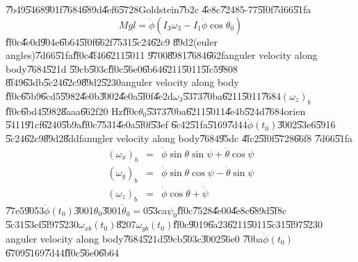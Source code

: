 \clearpage%


\U{7b49}\U{5468}\U{901f}\U{7684}\U{689d}\U{4ef6}\U{5728}Goldstein\U{7b2c}%
\U{4e8c}\U{7248}5-77\U{5f0f}\U{7d66}\U{51fa}%
\begin{equation*}
Mgl=\dot{\phi}\left( I_{3}\omega _{3}-I_{1}\dot{\phi}\cos \theta _{0}\right) 
\end{equation*}%
\U{ff0c}\U{4e0d}\U{904e}\U{6b64}\U{5f0f}\U{662f}\U{7531}\U{5c24}\U{62c9}%
\U{89d2}(euler angles)\U{7d66}\U{51fa}\U{ff0c}\U{4f46}\U{6211}\U{5011}%
\U{9700}\U{8981}\U{7684}\U{662f}anguler velocity along body\U{7684}\U{521d}%
\U{59cb}\U{503c}\U{ff0c}\U{56e0}\U{6b64}\U{6211}\U{5011}\U{5fc5}\U{9808}%
\U{8f49}\U{63db}\U{5c24}\U{62c9}\U{89d2}\U{5230}anguler velocity along body%
\U{ff0c}\U{65b9}\U{6cd5}\U{5982}\U{4e0b}\U{3002}\U{4e0a}\U{5f0f}\U{4e2d}$%
\omega _{3}$\U{5373}\U{70ba}\U{6211}\U{5011}\U{7684}$\left( \omega
_{z}\right) _{b}$\U{ff0c}\U{6bd4}\U{5982}\U{8aaa}\U{662f}20 Hz\U{ff0c}$%
\theta _{0}$\U{5373}\U{70ba}\U{6211}\U{5011}\U{4e4b}\U{524d}\U{7684}orien%
\U{5411}\U{91cf}\U{6240}\U{5b9a}\U{ff0c}\U{7531}\U{4e0a}\U{5f0f}\U{53ef}%
\U{6c42}\U{51fa}\U{5169}\U{7d44}$\dot{\phi}(t_{0})$\U{3002}\U{53e6}\U{5916}%
\U{5c24}\U{62c9}\U{89d2}\U{8ddf}anugler velocity along body\U{7684}\U{95dc}%
\U{4fc2}\U{5f0f}\U{5728}\U{66f8}\cite[Chapter 4, Equation 125]{goldstein} 
\U{7d66}\U{51fa}%
\begin{eqnarray*}
(\omega _{x})_{b} &=&\dot{\phi}\sin \theta \sin \psi +\dot{\theta}\cos \psi 
\\
(\omega _{y})_{b} &=&\dot{\phi}\sin \theta \cos \psi -\dot{\theta}\sin \psi 
\\
(\omega _{z})_{b} &=&\dot{\phi}\cos \theta +\dot{\psi}
\end{eqnarray*}%
\U{77e5}\U{9053}$\dot{\phi}(t_{0})$\U{3001}$\theta _{0}$\U{3001}$\dot{\theta}%
_{0}=0$\U{53ca}$\psi _{0}$\U{ff0c}\U{7528}\U{4e00}\U{4e8c}\U{689d}\U{5f8c}%
\U{5c31}\U{53ef}\U{5f97}\U{5230}$\omega _{xb}(t_{0})$\U{8207}$\omega
_{yb}(t_{0})$\U{ff0c}\U{9019}\U{6a23}\U{6211}\U{5011}\U{5c31}\U{5f97}\U{5230}%
anguler velocity along body\U{7684}\U{521d}\U{59cb}\U{503c}\U{3002}\U{56e0}%
\U{70ba}$\dot{\phi}(t_{0})$\U{6709}\U{5169}\U{7d44}\U{ff0c}\U{56e0}\U{6b64}%
